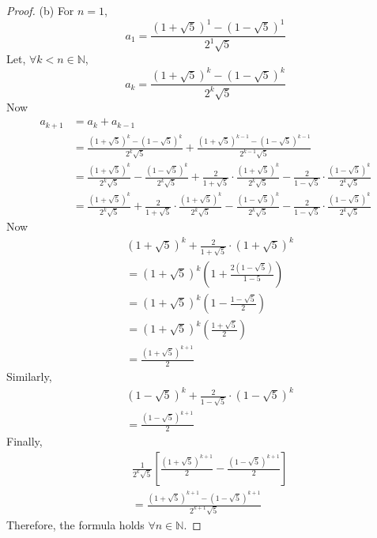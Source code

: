 \documentclass[12pt]{article}
\begin{document}
\begin{proof}
(b) For $n = 1$,
\[
a_1 = \frac{(1+\sqrt{5})^1 - (1-\sqrt{5})^1}{2^1\sqrt{5}}
\]
Let, $\forall k < n \in \mathbb{N}$,
\[
a_k = \frac{(1+\sqrt{5})^k - (1-\sqrt{5})^k}{2^k \sqrt{5}}
\]
Now
\begin{align*}
a_{k+1} & = a_k + a_{k-1} \\
& = \frac{(1+\sqrt{5})^k - (1-\sqrt{5})^k}{2^k \sqrt{5}} + \frac{(1+\sqrt{5})^{k-1} - (1-\sqrt{5})^{k-1}}{2^{k-1} \sqrt{5}} \\
& = \frac{(1+\sqrt{5})^k}{2^k \sqrt{5}} - \frac{(1-\sqrt{5})^k}{2^k \sqrt{5}} + \frac{2}{1 + \sqrt{5}}\cdot \frac{(1+\sqrt{5})^k}{2^k \sqrt{5}} - \frac{2}{1 - \sqrt{5}}\cdot \frac{(1-\sqrt{5})^k}{2^k \sqrt{5}} \\
& = \frac{(1+\sqrt{5})^k}{2^k \sqrt{5}} + \frac{2}{1+\sqrt{5}} \cdot \frac{(1+\sqrt{5})^k}{2^k \sqrt{5}} - \frac{(1-\sqrt{5})^k}{2^k \sqrt{5}} - \frac{2}{1 - \sqrt{5}}\cdot \frac{(1- \sqrt{5})^k}{2^k\sqrt{5}} 
\end{align*}
Now
\begin{align*}
& (1 + \sqrt{5})^k + \frac{2}{1 + \sqrt{5}}\cdot (1 + \sqrt{5})^k \\
& = (1 + \sqrt{5})^k \left( 1 + \frac{2(1-\sqrt{5})}{1 - 5} \right) \\
& = (1 + \sqrt{5})^k (1 - \frac{1 - \sqrt{5}}{2}) \\
& = (1 + \sqrt{5})^k (\frac{1 + \sqrt{5}}{2}) \\
& = \frac{(1 + \sqrt{5})^{k + 1}}{2}
\end{align*}
Similarly,
\begin{align*}
& (1 - \sqrt{5})^k + \frac{2}{1 - \sqrt{5}}\cdot (1 - \sqrt{5})^k \\
& = \frac{(1 - \sqrt{5})^{k+1}}{2}
\end{align*}
Finally,
\begin{align*}
& \frac{1}{2^k \sqrt{5}}[\frac{(1 + \sqrt{5})^{k+1}}{2} - \frac{(1 - \sqrt{5})^{k+1}}{2}] \\
& = \frac{(1 + \sqrt{5})^{k+1} - (1 - \sqrt{5})^{k+1}}{2^{k+1} \sqrt{5}}
\end{align*}
Therefore, the formula holds $\forall n \in \mathbb{N}$.

\end{proof}
\end{document}

